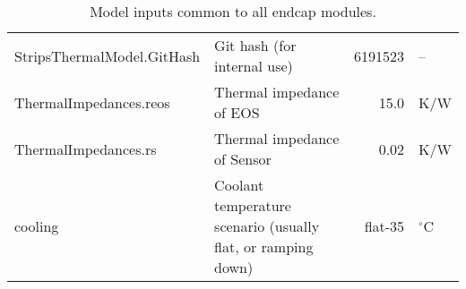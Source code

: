 \begin{table}[ht]
\begin{centering}
{\begin{tabular}{|l|l|r|l|}
StripsThermalModel.GitHash           & Git hash (for internal use)                                  &    6191523 & --          \\ 
ThermalImpedances.reos               & Thermal impedance of EOS                                     &       15.0 & K/W         \\ 
ThermalImpedances.rs                 & Thermal impedance of Sensor                                  &       0.02 & K/W         \\ 
cooling                              & Coolant temperature scenario (usually flat, or ramping down) &    flat-35 & $^{\circ}$C \\ 
\hline\end{tabular}
} %
\end{centering}
\caption{Model inputs common to all endcap modules.}
\end{table}

